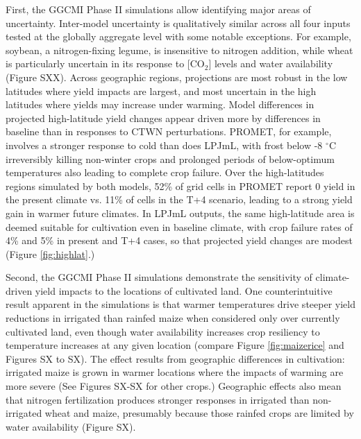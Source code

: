 \documentclass[gmd, manuscript]{copernicus} %
\begin{document}
First, the GGCMI Phase II simulations allow identifying major areas of uncertainty. 
Inter-model uncertainty is qualitatively similar across all four inputs tested at the globally aggregate level with some notable exceptions. 
For example, soybean, a nitrogen-fixing legume, is insensitive to nitrogen addition, while wheat is particularly uncertain in its response to [CO$_2$] levels and water availability (Figure SXX). 
Across geographic regions, projections are most robust in the low latitudes where yield impacts are largest, and most uncertain in the high latitudes where yields may increase under warming. 
Model differences in projected high-latitude yield changes appear driven more by differences in baseline than in responses to CTWN perturbations.  
PROMET, for example, involves a stronger response to cold than does LPJmL, with frost below -8 $^\circ$C irreversibly killing non-winter crops and prolonged periods of below-optimum temperatures also leading to complete crop failure. 
Over the high-latitudes regions simulated by both models, 52\% of grid cells in PROMET report 0 yield in the present climate vs. 11\% of cells in the T+4 scenario, leading to a strong yield gain in warmer future climates. 
In LPJmL outputs, the same high-latitude area is deemed suitable for cultivation even in baseline climate, with crop failure rates of 4\% and 5\% in present and T+4 cases, so that projected yield changes are modest (Figure \ref{fig:highlat}.)

Second, the GGCMI Phase II simulations demonstrate the sensitivity of climate-driven yield impacts to the locations of cultivated land. 
One counterintuitive result apparent in the simulations is that warmer temperatures drive steeper yield reductions in irrigated than rainfed maize when considered only over currently cultivated land, even though water availability increases crop resiliency to temperature increases at any given location (compare Figure \ref{fig:maizerice} and Figures SX to SX). 
The effect results from geographic differences in cultivation: irrigated maize is grown in warmer locations where the impacts of warming are more severe (See Figures SX-SX for other crops.) 
Geographic effects also mean that nitrogen fertilization produces stronger responses in irrigated than non-irrigated wheat and maize, presumably because those rainfed crops are limited by water availability (Figure SX).
\end{document}
